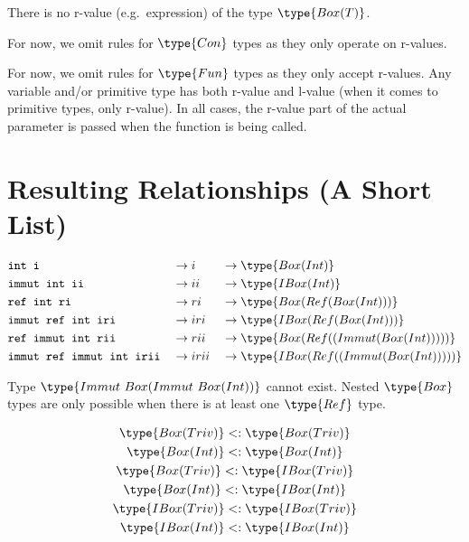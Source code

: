 \documentclass{article}
\newcommand\subtype{\mathrel{<:}}
\newcommand{\syntax}{\texttt}
\begin{document}
\medskip

There is no r-value (e.g.\ expression) of the type $\type{Box(T)}$.

\medskip

For now, we omit rules for $\type{Con}$ types as they only operate on r-values.

\medskip

For now, we omit rules for $\type{Fun}$ types as they only accept r-values.
Any variable and/or primitive type has both r-value and l-value (when it comes
to primitive types, only r-value). In all cases, the r-value part of the actual
parameter is passed when the function is being called.


\section*{Resulting Relationships (A Short List)}

\begin{align*}
  &\syntax{int i}                    &&\to i    &&\to \type{Box(Int)}\\
  &\syntax{immut int ii}             &&\to ii   &&\to \type{IBox(Int)}\\
  &\syntax{ref int ri}               &&\to ri   &&\to \type{Box(Ref(Box(Int)))}\\
  &\syntax{immut ref int iri}        &&\to iri  &&\to \type{IBox(Ref(Box(Int)))}\\
  &\syntax{ref immut int rii}        &&\to rii  &&\to \type{Box(Ref((Immut(Box(Int)))))}\\
  &\syntax{immut ref immut int irii} &&\to irii &&\to \type{IBox(Ref((Immut(Box(Int)))))}
\end{align*}

\medskip

Type $\type{Immut\ Box(Immut\ Box(Int))}$ cannot exist. Nested $\type{Box}$
types are only possible when there is at least one $\type{Ref}$ type.

\begin{gather*}
  \type{Box(Triv)}  \subtype \type{Box(Triv)}\\
  \type{Box(Int)}   \subtype \type{Box(Int)}\\
  \type{Box(Triv)}  \subtype \type{IBox(Triv)}\\
  \type{Box(Int)}   \subtype \type{IBox(Int)}\\
  \type{IBox(Triv)} \subtype \type{IBox(Triv)}\\
  \type{IBox(Int)}  \subtype \type{IBox(Int)}
\end{gather*}
\end{document}
